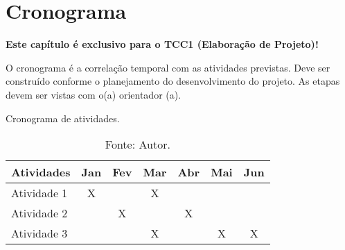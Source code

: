\chapter{Cronograma}

\textbf{Este capítulo é exclusivo para o TCC1 (Elaboração de Projeto)!}

O cronograma é a correlação temporal com as atividades previstas. Deve ser construído conforme o planejamento do desenvolvimento do projeto. As etapas devem ser vistas com o(a) orientador (a).

\begin{table}[h]
    \centering
    \caption{Cronograma de atividades.}
    \renewcommand{\arraystretch}{1.3}
    \begin{tabular}{|l|c|c|c|c|c|c|}
        \hline
        \textbf{Atividades} & \textbf{Jan} & \textbf{Fev} & \textbf{Mar} & \textbf{Abr} & \textbf{Mai} & \textbf{Jun} \\
        \hline
        Atividade 1 & X &   & X &   &   &   \\
        \hline
        Atividade 2 &   & X &   & X &   &   \\
        \hline
        Atividade 3 &   &   & X &   & X & X \\
        \hline
    \end{tabular}
    \vspace{5pt} %
    \caption*{Fonte: Autor.} %
    \label{tab:cronograma}
\end{table}